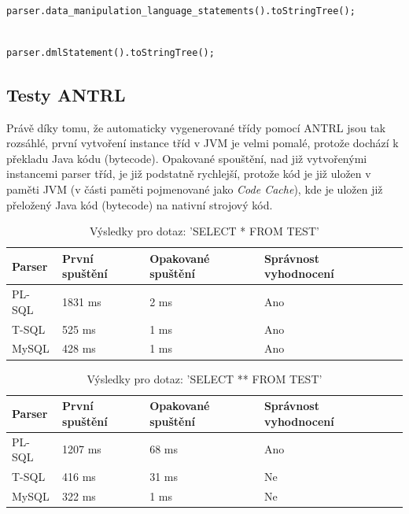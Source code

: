 \documentclass[czech,bachelor,public,dept460,male,cpdeclaration,twoside]{diploma}
\begin{document}
\begin{lstlisting}[caption=PL-SQL Parser]

parser.data_manipulation_language_statements().toStringTree();
\end{lstlisting}

\begin{lstlisting}[caption=MySQL Parser]

parser.dmlStatement().toStringTree();
\end{lstlisting}

\newpage

\subsection{Testy ANTRL}
Právě díky tomu, že automaticky vygenerované třídy pomocí ANTRL jsou tak rozsáhlé, první vytvoření instance tříd v JVM je velmi pomalé, protože dochází k překladu Java kódu (bytecode). Opakované spouštění, nad již vytvořenými instancemi parser tříd, je již podstatně rychlejší, protože kód je již uložen v paměti JVM (v části paměti pojmenované jako \textit{Code Cache}), kde je uložen již přeložený Java kód (bytecode) na nativní strojový kód.

\begin{table}[!htbp]
	\centering
	\caption{Výsledky pro dotaz: 'SELECT * FROM TEST'}
	\label{tab:antrl1}
	\begin{tabular}{lllll}
		\toprule
		Parser & První spuštění & Opakované spuštění & Správnost vyhodnocení\\
		\midrule
		PL-SQL & 1831 ms & 2 ms & Ano \\
        T-SQL & 525 ms & 1 ms & Ano \\
        MySQL & 428 ms & 1 ms & Ano \\
		\midrule
	\end{tabular}
\end{table}

\begin{table}[!htbp]
	\centering
	\caption{Výsledky pro dotaz: 'SELECT ** FROM TEST'}
	\label{tab:antrl2}
	\begin{tabular}{lllll}
		\toprule
		Parser & První spuštění & Opakované spuštění & Správnost vyhodnocení\\
		\midrule
		PL-SQL & 1207 ms & 68 ms & Ano \\
        T-SQL & 416 ms &31 ms & Ne \\
        MySQL & 322 ms & 1 ms & Ne \\
		\midrule
	\end{tabular}
\end{table}
\end{document}
